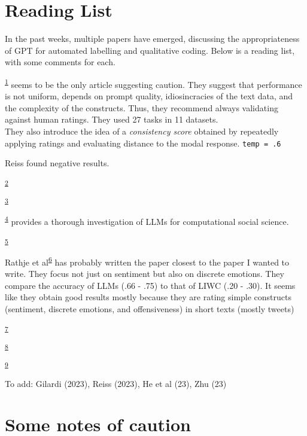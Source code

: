 \documentclass[
  10pt,
  letterpaper,
  DIV=11,
  numbers=noendperiod]{scrartcl}
\begin{document}
\hypertarget{reading-list}{%
\section{Reading List}\label{reading-list}}

In the past weeks, multiple papers have emerged, discussing the
appropriateness of GPT for automated labelling and qualitative coding.
Below is a reading list, with some comments for each.

\textsuperscript{\protect\hyperlink{ref-pangakis}{1}} seems to be the
only article suggesting caution. They suggest that performance is not
uniform, depends on prompt quality, idiosincracies of the text data, and
the complexity of the constructs. Thus, they recommend always validating
against human ratings. They used 27 tasks in 11 datasets.\\
They also introduce the idea of a \emph{consistency score} obtained by
repeatedly applying ratings and evaluating distance to the modal
response. \texttt{temp\ =\ .6}

Reiss found negative results.

\textsuperscript{\protect\hyperlink{ref-kim}{2}}

\textsuperscript{\protect\hyperlink{ref-dillion2023}{3}}

\textsuperscript{\protect\hyperlink{ref-ziems}{4}} provides a thorough
investigation of LLMs for computational social science.

\textsuperscript{\protect\hyperlink{ref-sahu}{5}}

Rathje et al\textsuperscript{\protect\hyperlink{ref-rathje}{6}} has
probably written the paper closest to the paper I wanted to write. They
focus not just on sentiment but also on discrete emotions. They compare
the accuracy of LLMs (.66 - .75) to that of LIWC (.20 - .30). It seems
like they obtain good results mostly because they are rating simple
constructs (sentiment, discrete emotions, and offensiveness) in short
texts (mostly tweets)

\textsuperscript{\protect\hyperlink{ref-ding}{7}}

\textsuperscript{\protect\hyperlink{ref-liu}{8}}

\textsuperscript{\protect\hyperlink{ref-wang2021}{9}}

To add: Gilardi (2023), Reiss (2023), He et al (23), Zhu (23)

\hypertarget{some-notes-of-caution}{%
\section{Some notes of caution}\label{some-notes-of-caution}}
\end{document}
